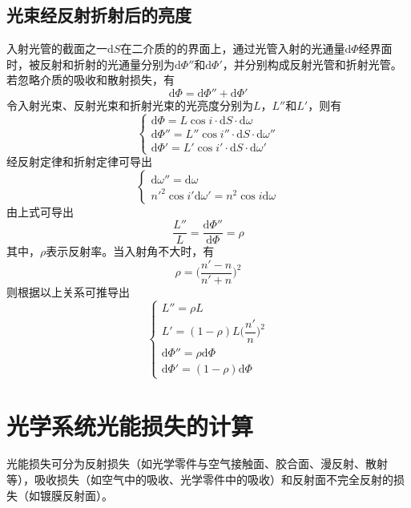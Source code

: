 \documentclass[cn,10pt,chinesefont=founder,math=newtx,cite=super,twoside]{elegantbook}
\begin{document}
\subsection{光束经反射折射后的亮度}
入射光管的截面之一$\mathrm{d}S$在二介质的的界面上，通过光管入射的光通量$\mathrm{d}\varPhi$经界面时，被反射和折射的光通量分别为$\mathrm{d}\varPhi''$和$\mathrm{d}\varPhi'$，并分别构成反射光管和折射光管。若忽略介质的吸收和散射损失，有
\begin{equation}
\mathrm{d}\varPhi=\mathrm{d}\varPhi''+\mathrm{d}\varPhi'
\end{equation}
令入射光束、反射光束和折射光束的光亮度分别为$L$，$L''$和$L'$，则有
\begin{equation}
\begin{cases}
\mathrm{d}\varPhi=L\cos i\cdot\mathrm{d}S\cdot\mathrm{d}\omega\\
\mathrm{d}\varPhi''=L''\cos i''\cdot\mathrm{d}S\cdot\mathrm{d}\omega''\\
\mathrm{d}\varPhi'=L'\cos i'\cdot\mathrm{d}S\cdot\mathrm{d}\omega'
\end{cases}
\end{equation}
经反射定律和折射定律可导出
\begin{equation}
\begin{cases}
\mathrm{d}\omega''=\mathrm{d}\omega\\
n'^2\cos i'\mathrm{d}\omega'=n^2\cos i\mathrm{d}\omega 
\end{cases}
\end{equation}
由上式可导出
\begin{equation}
\frac{L''}{L}=\frac{\mathrm{d}\varPhi''}{\mathrm{d}\varPhi}=\rho
\end{equation}
其中，$\rho$表示反射率。当入射角不大时，有
\begin{equation}
\rho=\bigg(\frac{n'-n}{n'+n}\bigg)^2
\end{equation}
则根据以上关系可推导出
\begin{equation}
\begin{cases}
L''=\rho L\\
L'=(1-\rho)L\bigg(\dfrac{n'}{n}\bigg)^2\\
\mathrm{d}\varPhi''=\rho\mathrm{d}\varPhi\\
\mathrm{d}\varPhi'=(1-\rho)\mathrm{d}\varPhi
\end{cases}
\end{equation}

\section{光学系统光能损失的计算}
光能损失可分为反射损失（如光学零件与空气接触面、胶合面、漫反射、散射等），吸收损失（如空气中的吸收、光学零件中的吸收）和反射面不完全反射的损失（如镀膜反射面）。
\end{document}
